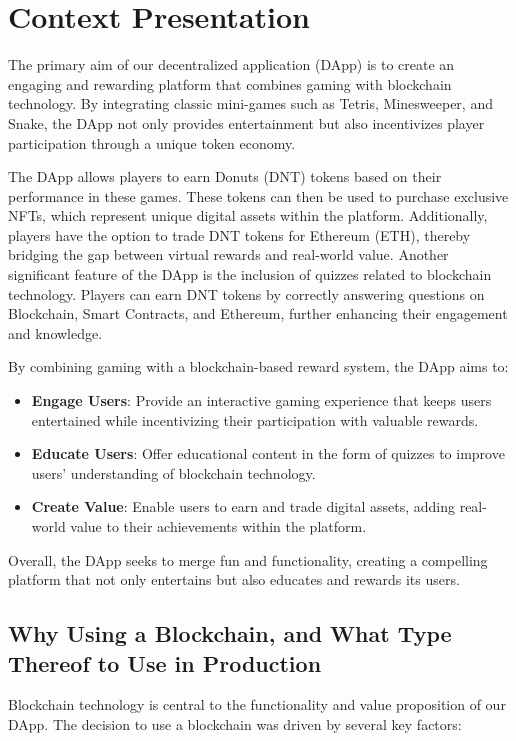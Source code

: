 \documentclass[main.tex]{subfiles}
\begin{document}
\section{Context Presentation}\label{sec:context_presentations}
The primary aim of our decentralized application (DApp) is to create an engaging and rewarding platform that combines gaming with blockchain technology. By integrating classic mini-games such as Tetris, Minesweeper, and Snake, the DApp not only provides entertainment but also incentivizes player participation through a unique token economy.

The DApp allows players to earn Donuts (DNT) tokens based on their performance in these games. These tokens can then be used to purchase exclusive NFTs, which represent unique digital assets within the platform. Additionally, players have the option to trade DNT tokens for Ethereum (ETH), thereby bridging the gap between virtual rewards and real-world value. Another significant feature of the DApp is the inclusion of quizzes related to blockchain technology. Players can earn DNT tokens by correctly answering questions on Blockchain, Smart Contracts, and Ethereum, further enhancing their engagement and knowledge.

By combining gaming with a blockchain-based reward system, the DApp aims to:
\begin{itemize}
    \item \textbf{Engage Users}: Provide an interactive gaming experience that keeps users entertained while incentivizing their participation with valuable rewards.
    \item \textbf{Educate Users}: Offer educational content in the form of quizzes to improve users' understanding of blockchain technology.
    \item \textbf{Create Value}: Enable users to earn and trade digital assets, adding real-world value to their achievements within the platform.
\end{itemize}
Overall, the DApp seeks to merge fun and functionality, creating a compelling platform that not only entertains but also educates and rewards its users.

\subsection{Why Using a Blockchain, and What Type Thereof to Use in Production}

Blockchain technology is central to the functionality and value proposition of our DApp. The decision to use a blockchain was driven by several key factors:
\end{document}
